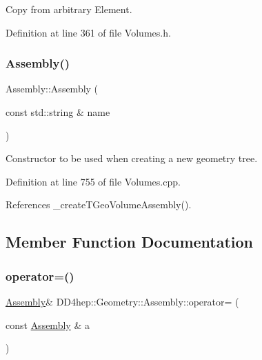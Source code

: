Copy from arbitrary Element. 



Definition at line 361 of file Volumes.\+h.

\hypertarget{class_d_d4hep_1_1_geometry_1_1_assembly_ac077a7f58738bc18ea24650128af2680}{}\label{class_d_d4hep_1_1_geometry_1_1_assembly_ac077a7f58738bc18ea24650128af2680} 
\subsubsection{\texorpdfstring{Assembly()}{Assembly()}\hspace{0.1cm}{\footnotesize\ttfamily [4/4]}}
{\footnotesize\ttfamily Assembly\+::\+Assembly (\begin{DoxyParamCaption}\item[{const std\+::string \&}]{name }\end{DoxyParamCaption})}



Constructor to be used when creating a new geometry tree. 



Definition at line 755 of file Volumes.\+cpp.



References \+\_\+create\+T\+Geo\+Volume\+Assembly().



\subsection{Member Function Documentation}
\hypertarget{class_d_d4hep_1_1_geometry_1_1_assembly_a49d6772ff3ef1ed2a49a27ce35caaaac}{}\label{class_d_d4hep_1_1_geometry_1_1_assembly_a49d6772ff3ef1ed2a49a27ce35caaaac} 
\subsubsection{\texorpdfstring{operator=()}{operator=()}}
{\footnotesize\ttfamily \hyperlink{class_d_d4hep_1_1_geometry_1_1_assembly}{Assembly}\& D\+D4hep\+::\+Geometry\+::\+Assembly\+::operator= (\begin{DoxyParamCaption}\item[{const \hyperlink{class_d_d4hep_1_1_geometry_1_1_assembly}{Assembly} \&}]{a }\end{DoxyParamCaption})\hspace{0.3cm}{\ttfamily [inline]}}



